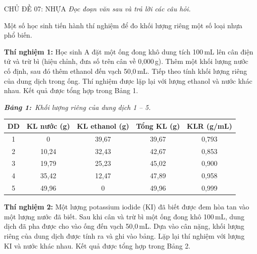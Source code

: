 \documentclass[12pt,a4paper,twoside]{article}
\newcommand{\tablecaption}[2]{%
    \par\vspace{2pt}%
    {\centering\textbf{\textit{Bảng #1:}}~\textit{#2}\par}%
    \vspace{0pt}%
}
\newenvironment{readingpassage}[1][]{%
    \begin{tcolorbox}[enhanced, colback=grayLight, colframe=secondaryBlue,
        coltitle=textDark, fonttitle=\bfseries, title={#1},
        rounded corners, arc=3mm, boxrule=1pt,
        left=15pt, right=15pt, top=10pt, bottom=10pt,
        breakable, before skip=10pt, after skip=10pt, drop fuzzy shadow]
    \setstretch{1.3}
}{\end{tcolorbox}}
\begin{document}
\label{b1_cd07}
\begin{topicbox}{\large CHỦ ĐỀ 07: NHỰA}
\vspace{8pt}
\textit{Đọc đoạn văn sau và trả lời các câu hỏi.}
\vspace{6pt}
\end{topicbox}
\vspace{5pt}
\begin{readingpassage}[]
Một số học sinh tiến hành thí nghiệm để đo khối lượng riêng một số loại nhựa phổ biến.

\textbf{Thí nghiệm 1:} Học sinh A đặt một ống đong khô dung tích 100\,mL lên cân điện tử và trừ bì (hiệu chỉnh, đưa số trên cân về 0,000\,g). Thêm một khối lượng nước cố định, sau đó thêm ethanol đến vạch 50,0\,mL. Tiếp theo tính khối lượng riêng của dung dịch trong ống. Thí nghiệm được lặp lại với lượng ethanol và nước khác nhau. Kết quả được tổng hợp trong Bảng 1.

\tablecaption{1}{Khối lượng riêng của dung dịch 1 -- 5.}
\renewcommand{\arraystretch}{1.3}
{\small
{}%
\begin{center}
\begin{tabular}{|c|c|c|c|c|}
\hline
\rowcolor{primaryBlue!12}
\textbf{DD} & \textbf{KL nước (g)} & \textbf{KL ethanol (g)} & \textbf{Tổng KL (g)} & \textbf{KLR (g/mL)} \\
\hline
1 & 0 & 39,67 & 39,67 & 0,793 \\
\hline
2 & 10,24 & 32,43 & 42,67 & 0,853 \\
\hline
3 & 19,79 & 25,23 & 45,02 & 0,900 \\
\hline
4 & 35,42 & 12,47 & 47,89 & 0,958 \\
\hline
5 & 49,96 & 0 & 49,96 & 0,999 \\
\hline
\end{tabular}
\end{center}
}

\vspace{6pt}
\textbf{Thí nghiệm 2:} Một lượng potassium iodide (KI) đã biết được đem hòa tan vào một lượng nước đã biết. Sau khi cân và trừ bì một ống đong khô 100\,mL, dung dịch đã pha được cho vào ống đến vạch 50,0\,mL. Dựa vào cân nặng, khối lượng riêng của dung dịch được tính ra và ghi vào bảng. Lặp lại thí nghiệm với lượng KI và nước khác nhau. Kết quả được tổng hợp trong Bảng 2.


\end{readingpassage}
\end{document}
